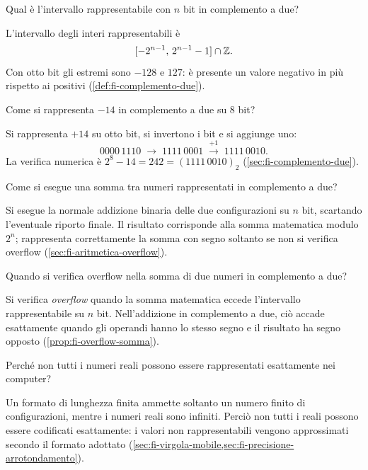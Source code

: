 \begin{exercise}
\label{ex:fi-rappresentazione-intervallo-complemento-due}
Qual è l'intervallo rappresentabile con \(n\) bit in complemento a due?
\end{exercise}

L'intervallo degli interi rappresentabili è
\[
  [-2^{n-1},\,2^{n-1}-1]\cap\mathbb{Z}.
\]
Con otto bit gli estremi sono \(-128\) e \(127\): è presente
un valore negativo in più rispetto ai positivi
(\cref{def:fi-complemento-due}).

\begin{exercise}
\label{ex:fi-rappresentazione-meno-quattordici}
Come si rappresenta \(-14\) in complemento a due su 8 bit?
\end{exercise}

Si rappresenta \(+14\) su otto bit, si invertono i bit e si aggiunge uno:
\[
  0000\,1110 \;\longrightarrow\; 1111\,0001
  \;\xrightarrow{+1}\;1111\,0010.
\]
La verifica numerica è \(2^8-14=242=(1111\,0010)_2\)
(\cref{sec:fi-complemento-due}).

\begin{exercise}
\label{ex:fi-rappresentazione-somma-complemento-due}
Come si esegue una somma tra numeri rappresentati in complemento
a due?
\end{exercise}

Si esegue la normale addizione binaria delle due configurazioni
su \(n\) bit, scartando l'eventuale riporto finale. Il risultato
corrisponde alla somma matematica modulo \(2^n\); rappresenta
correttamente la somma con segno soltanto se non si verifica overflow
(\cref{sec:fi-aritmetica-overflow}).

\begin{exercise}
\label{ex:fi-rappresentazione-overflow-somma}
Quando si verifica overflow nella somma di due numeri in
complemento a due?
\end{exercise}

Si verifica \emph{overflow} quando la somma matematica eccede
l'intervallo rappresentabile su \(n\) bit. Nell'addizione in
complemento a due, ciò accade esattamente quando gli operandi
hanno lo stesso segno e il risultato ha segno opposto
(\cref{prop:fi-overflow-somma}).

\begin{exercise}
\label{ex:fi-rappresentazione-reali-approssimati}
Perché non tutti i numeri reali possono essere rappresentati
esattamente nei computer?
\end{exercise}

Un formato di lunghezza finita ammette soltanto un numero finito
di configurazioni, mentre i numeri reali sono infiniti. Perciò
non tutti i reali possono essere codificati esattamente: i valori
non rappresentabili vengono approssimati secondo il formato
adottato (\cref{sec:fi-virgola-mobile,sec:fi-precisione-arrotondamento}).

